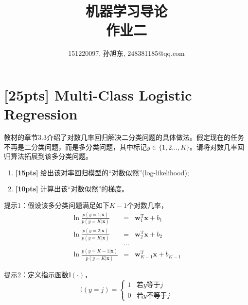 \documentclass[a4paper,UTF8]{article}
\numberwithin{equation}{section}
\begin{document}
\title{机器学习导论\\
作业二}
\author{151220097, 孙旭东, 248381185@qq.com}
\maketitle

\section{[25pts] Multi-Class Logistic Regression}
教材的章节3.3介绍了对数几率回归解决二分类问题的具体做法。假定现在的任务不再是二分类问题，而是多分类问题，其中标记$y\in\{1,2\dots,K\}$。请将对数几率回归算法拓展到该多分类问题。

\begin{enumerate}[(1)]
	\item \textbf{[15pts]} 给出该对率回归模型的“对数似然”(log-likelihood);
	\item \textbf{[10pts]} 计算出该“对数似然”的梯度。
\end{enumerate}

提示1：假设该多分类问题满足如下$K-1$个对数几率，
\begin{eqnarray*}
	\ln\frac{p(y=1|\mathbf{x})}{p(y=K|\mathbf{x})}&=&\mathbf{w}_1^\mathrm{T}\mathbf{x}+b_1\\
	\ln\frac{p(y=2|\mathbf{x})}{p(y=K|\mathbf{x})}&=&\mathbf{w}_2^\mathrm{T}\mathbf{x}+b_2\\
	&\dots&\\
	\ln\frac{p(y={K-1}|\mathbf{x})}{p(y=K|\mathbf{x})}&=&\mathbf{w}_{K-1}^\mathrm{T}\mathbf{x}+b_{K-1}
\end{eqnarray*}

提示2：定义指示函数$\mathbb{I}(\cdot)$，
$$\mathbb{I}(y=j)=
\begin{cases}
1& \text{若$y$等于$j$}\\
0& \text{若$y$不等于$j$}
\end{cases}$$
\end{document}
